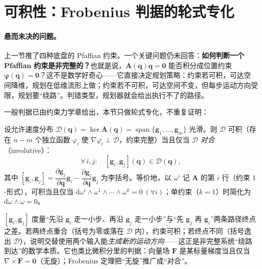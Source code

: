 \section{可积性：Frobenius 判据的轮式专化}
\label{sec:mw-integrability}

\paragraph{悬而未决的问题。}
上一节推了四种底盘的 Pfaffian 约束。一个关键问题仍未回答：\textbf{如何判断一个 Pfaffian 约束是非完整的？}也就是说，$\mathbf{A}(\mathbf{q})\dot{\mathbf{q}}=\mathbf{0}$ 能否积分成位置约束 $\boldsymbol{\varphi}(\mathbf{q})=\mathbf{0}$？这不是数学好奇心——它直接决定规划策略：约束若可积，可达空间降维，规划在低维流形上做；约束若不可积，可达空间不变，但每步运动方向受限，规划要“绕路”。判错类型，规划器就会给出执行不了的路径。

一般判据已由约束力学章给出，本节只做轮式专化，不重复证明：

\begin{theorem}[可积判据 = Frobenius（轮式专化，引自 \cref{thm:cd-frobenius}）]\label{thm:mw-frobenius}
设允许速度分布 $\mathcal{D}(\mathbf{q})=\ker\mathbf{A}(\mathbf{q})=\operatorname{span}\{\mathbf{g}_1,\dots,\mathbf{g}_m\}$ 光滑。则 $\mathcal{D}$ 可积（存在 $n-m$ 个独立函数 $\varphi_i$ 使 $\nabla\varphi_i\perp\mathcal{D}$，约束完整）当且仅当 $\mathcal{D}$ \emph{对合}（involutive）：
\begin{equation}
  \forall\,i,j:\quad [\mathbf{g}_i,\mathbf{g}_j](\mathbf{q})\in\mathcal{D}(\mathbf{q}),
  \label{eq:mw-involutive}
\end{equation}
其中 $[\mathbf{g}_i,\mathbf{g}_j]=\dfrac{\partial\mathbf{g}_j}{\partial\mathbf{q}}\mathbf{g}_i-\dfrac{\partial\mathbf{g}_i}{\partial\mathbf{q}}\mathbf{g}_j$ 为李括号。等价地，以 $\omega^i$ 记 $\mathbf{A}$ 的第 $i$ 行（约束 $1$-形式），可积当且仅当 $\mathrm{d}\omega^i\wedge\omega^1\wedge\cdots\wedge\omega^k=0\ (\forall i)$；单约束（$k=1$）时简化为 $\mathrm{d}\omega\wedge\omega=0$。
\end{theorem}

\begin{insight}[李括号的几何含义]\label{ins:mw-bracket}
$[\mathbf{g}_i,\mathbf{g}_j]$ 度量“先沿 $\mathbf{g}_i$ 走一小步、再沿 $\mathbf{g}_j$ 走一小步”与“先 $\mathbf{g}_j$ 再 $\mathbf{g}_i$”两条路径终点之差。若两终点重合（括号为零或落在 $\mathcal{D}$ 内），约束可积；若终点不同（括号逸出 $\mathcal{D}$），说明交替使用两个输入能\emph{生成新的运动方向}——这正是非完整系统“绕路到达”的数学本质。它也类比微积分里的判据：向量场 $\mathbf{F}$ 是某标量梯度当且仅当 $\nabla\times\mathbf{F}=\mathbf{0}$（无旋）；Frobenius 定理把“无旋”推广成“对合”。
\end{insight}

